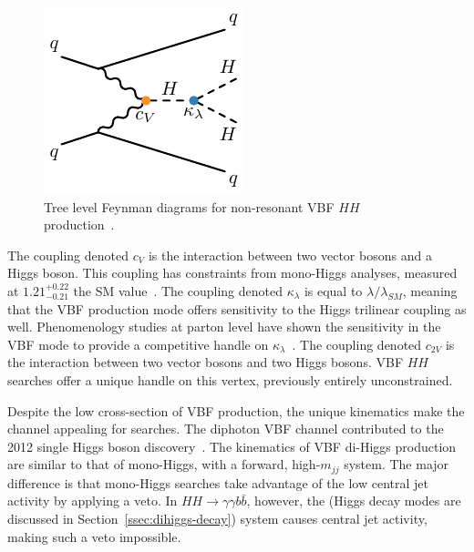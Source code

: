\begin{figure}[!thp]
\begin{minipage}[c]{.31\textwidth}
    \end{minipage}
    \begin{minipage}[c]{.31\textwidth}
        \includegraphics[width=\textwidth]{chapters/chapter1_theory/images/vbf_klambda.pdf}
    \end{minipage}

    \caption[Tree level Feynman diagrams for non-resonant \gls{VBF} $HH$ production]{Tree level Feynman diagrams for non-resonant \gls{VBF} $HH$ production~\cite{vbf_4b}.}
    \label{fig:vbf_feyn}
\end{figure}

The coupling denoted $c_V$ is the interaction between two vector bosons and a Higgs boson. This coupling has constraints from mono-Higgs analyses, measured at $1.21^{+0.22}_{-0.21}$ the \gls{SM} value~\cite{higgs-measurements}. The coupling denoted $\kappa_{\lambda}$ is equal to $\lambda/\lambda_{SM}$, meaning that the \gls{VBF} production mode offers sensitivity to the Higgs trilinear coupling as well. Phenomenology studies at parton level have shown the sensitivity in the \gls{VBF} mode to provide a competitive handle on $\kappa_{\lambda}$~\cite{vbf_lambda}. The coupling denoted $c_{2V}$ is the interaction between two vector bosons and two Higgs bosons. \gls{VBF} $HH$ searches offer a unique handle on this vertex, previously entirely unconstrained.

Despite the low cross-section of \gls{VBF} production, the unique kinematics make the channel appealing for searches. The diphoton \gls{VBF} channel contributed to the 2012 single Higgs boson discovery~\cite{higgs-discovery-atlas}. The kinematics of \gls{VBF} di-Higgs production are similar to that of mono-Higgs, with a forward, high-$m_{jj}$ system. The major difference is that mono-Higgs searches take advantage of the low central jet activity by applying a veto. In $HH \rightarrow \gamma \gamma b\bar{b}$, however, the \Hbb (Higgs decay modes are discussed in Section~\ref{ssec:dihiggs-decay}) system causes central jet activity, making such a veto impossible.



